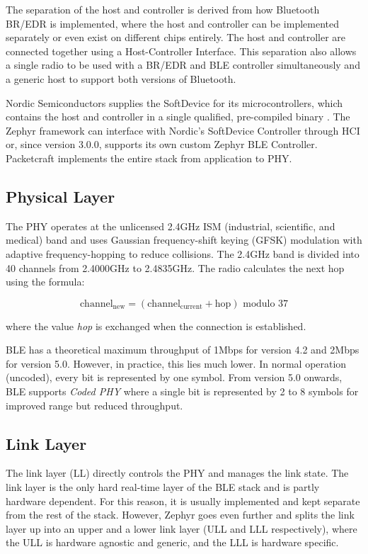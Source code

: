 The separation of the host and controller is derived from how Bluetooth BR/EDR is implemented, where the host and controller can be implemented separately or even exist on different chips entirely. The host and controller are connected together using a Host-Controller Interface. This separation also allows a single radio to be used with a BR/EDR and BLE controller simultaneously and a generic host to support both versions of Bluetooth.

Nordic Semiconductors supplies the SoftDevice for its microcontrollers, which contains the host and controller in a single qualified, pre-compiled binary \cite{nordic_softdevices}. The Zephyr framework can interface with Nordic's SoftDevice Controller through HCI or, since version 3.0.0, supports its own custom Zephyr BLE Controller. Packetcraft implements the entire stack from application to PHY.

\subsection{Physical Layer} The PHY operates at the unlicensed 2.4GHz ISM (industrial, scientific, and medical) band and uses Gaussian frequency-shift keying (GFSK) modulation with adaptive frequency-hopping to reduce collisions. The 2.4GHz band is divided into 40 channels from 2.4000GHz to 2.4835GHz. The radio calculates the next hop using the formula:

\[\text{channel}_{\text{new}} = (\text{channel}_{\text{current}} + \text{hop}) \text{ modulo } 37\]
    
where the value \textit{hop} is exchanged when the connection is established.

BLE has a theoretical maximum throughput of 1Mbps for version 4.2 and 2Mbps for version 5.0. However, in practice, this lies much lower. In normal operation (uncoded), every bit is represented by one symbol. From version 5.0 onwards, BLE supports \textit{Coded PHY} where a single bit is represented by 2 to 8 symbols for improved range but reduced throughput.

\subsection{Link Layer} 
The link layer (LL) directly controls the PHY and manages the link state. The link layer is the only hard real-time layer of the BLE stack and is partly hardware dependent. For this reason, it is usually implemented and kept separate from the rest of the stack. However, Zephyr goes even further and splits the link layer up into an upper and a lower link layer (ULL and LLL respectively), where the ULL is hardware agnostic and generic, and the LLL is hardware specific.

